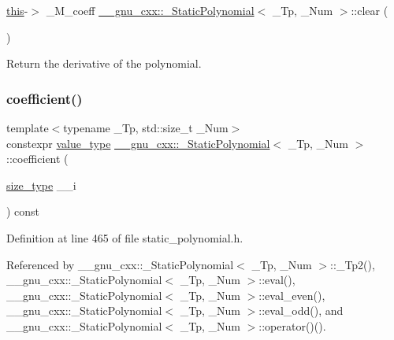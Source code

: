 {\hyperlink{class____gnu__cxx_1_1__StaticPolynomial_a4de3c06513ac6f8677fe098213a89fff}{this}-\/$>$ \+\_\+\+M\+\_\+coeff \hyperlink{class____gnu__cxx_1_1__StaticPolynomial}{\+\_\+\+\_\+gnu\+\_\+cxx\+::\+\_\+\+Static\+Polynomial}$<$ \+\_\+\+Tp, \+\_\+\+Num $>$\+::clear (\begin{DoxyParamCaption}{ }\end{DoxyParamCaption})}

Return the derivative of the polynomial. \mbox{\label{class____gnu__cxx_1_1__StaticPolynomial_a412fc570171031ff0f45db048dfda225}} 
\subsubsection{\texorpdfstring{coefficient()}{coefficient()}\hspace{0.1cm}{\footnotesize\ttfamily [1/2]}}
{\footnotesize\ttfamily template$<$typename \+\_\+\+Tp, std\+::size\+\_\+t \+\_\+\+Num$>$ \\
constexpr \hyperlink{class____gnu__cxx_1_1__StaticPolynomial_af23110f5a002cd6caa3542df7cf35284}{value\+\_\+type} \hyperlink{class____gnu__cxx_1_1__StaticPolynomial}{\+\_\+\+\_\+gnu\+\_\+cxx\+::\+\_\+\+Static\+Polynomial}$<$ \+\_\+\+Tp, \+\_\+\+Num $>$\+::coefficient (\begin{DoxyParamCaption}\item[{\hyperlink{class____gnu__cxx_1_1__StaticPolynomial_a3384ce6a956ad398fc995e6ee53b2b18}{size\+\_\+type}}]{\+\_\+\+\_\+i }\end{DoxyParamCaption}) const\hspace{0.3cm}{\ttfamily [inline]}}



Definition at line 465 of file static\+\_\+polynomial.\+h.



Referenced by \+\_\+\+\_\+gnu\+\_\+cxx\+::\+\_\+\+Static\+Polynomial$<$ \+\_\+\+Tp, \+\_\+\+Num $>$\+::\+\_\+\+Tp2(), \+\_\+\+\_\+gnu\+\_\+cxx\+::\+\_\+\+Static\+Polynomial$<$ \+\_\+\+Tp, \+\_\+\+Num $>$\+::eval(), \+\_\+\+\_\+gnu\+\_\+cxx\+::\+\_\+\+Static\+Polynomial$<$ \+\_\+\+Tp, \+\_\+\+Num $>$\+::eval\+\_\+even(), \+\_\+\+\_\+gnu\+\_\+cxx\+::\+\_\+\+Static\+Polynomial$<$ \+\_\+\+Tp, \+\_\+\+Num $>$\+::eval\+\_\+odd(), and \+\_\+\+\_\+gnu\+\_\+cxx\+::\+\_\+\+Static\+Polynomial$<$ \+\_\+\+Tp, \+\_\+\+Num $>$\+::operator()().


